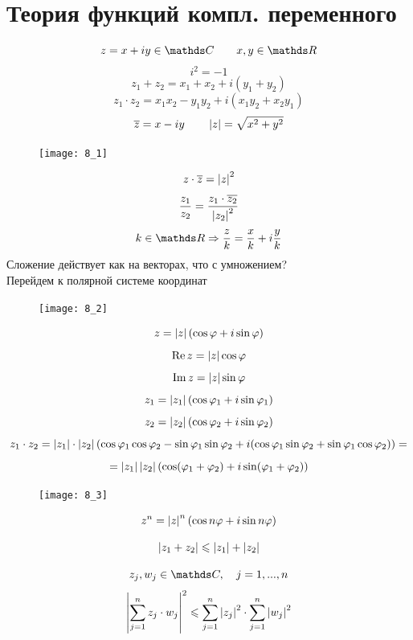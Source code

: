 \documentclass[main]{subfiles}
\begin{document}
	\newpage
	\section{Теория функций компл. переменного}
	\begin{Reminder}
	    \[z = x + iy \in \CC \qq x, y \in \R\]
		\[i^2 = -1\]
		\[z_1 + z_2 = x_1 + x_2 + i(y_1 + y_2)\]
		\[z_1 \cdot z_2 = x_1 x_2 - y_1 y_2 + i(x_1 y_2  + x_2 y_1)\]
		\[\overline{z} = x - iy \qquad \left|z\right| = \sqrt{x^2 + y^2}\]
		\begin{figure}[H]
	        \centering
	        \texttt{[image: 8\_1]}
		\end{figure}
		\[z \cdot \overline{z} = \left|z\right|^2\]
		\[\frac{z_1}{z_2} = \frac{z_1 \cdot \overline{z_2}}{\left|z_2\right|^2}\]
		\[k \in \R \Ra \frac{z}{k} = \frac{x}{k} + i \frac{y}{k}\]
		Сложение действует как на векторах, что с умножением?\\
		Перейдем к полярной системе координат
		\begin{figure}[H]
	        \centering
	        \texttt{[image: 8\_2]}
		\end{figure}
		\[z = \left|z\right| (\cos \varphi + i \sin \varphi)\]
		\[\mathop{\rm Re}\nolimits z = \left|z\right| \cos \varphi\]
		\[\mathop{\rm Im}\nolimits z = \left|z\right| \sin \varphi\]
		\[z_1 = \left|z_1\right| (\cos \varphi_1 + i \sin \varphi_1)\]
		\[z_2 = \left|z_2\right| (\cos \varphi_2 + i \sin \varphi_2)\]
		\[z_1 \cdot z_2 = \left|z_1\right| \cdot \left|z_2\right|
		(\cos \varphi_1 \cos \varphi_2 - \sin \varphi_1 \sin \varphi_2
	    +i(\cos \varphi_1 \sin \varphi_2 + \sin \varphi_1 \cos \varphi_2)) = \]
		\[ = \left|z_1\right| \left|z_2\right| (\cos(\varphi_1 + \varphi_2) +
		i \sin (\varphi_1 + \varphi_2))\]
		\begin{figure}[H]
	        \centering
	        \texttt{[image: 8\_3]}
		\end{figure}
	\end{Reminder}

	\begin{Theorem} [Ф-ла Муавра]
		\[z^n = \left|z\right|^n (\cos{n \varphi} + i \sin n \varphi )\]
	\end{Theorem}

	\begin{Utv} [н-во \bigtriangleup]
		\[\left|z_1 + z_2\right| \leqslant \left|z_1\right| + \left|z_2\right|\]
	\end{Utv}

	\begin{Theorem} [н-во Коши]
	    \[z_j, w_j \in \CC, \q j = 1, ..., n\]
		\[\left|\sum_{j = 1}^n z_j \cdot w_j\right|^2 \leqslant \sum_{j = 1}^n
		\left|z_j\right|^2 \cdot \sum_{j = 1}^n \left|w_j\right|^2 \]
	\end{Theorem}
\end{document}
